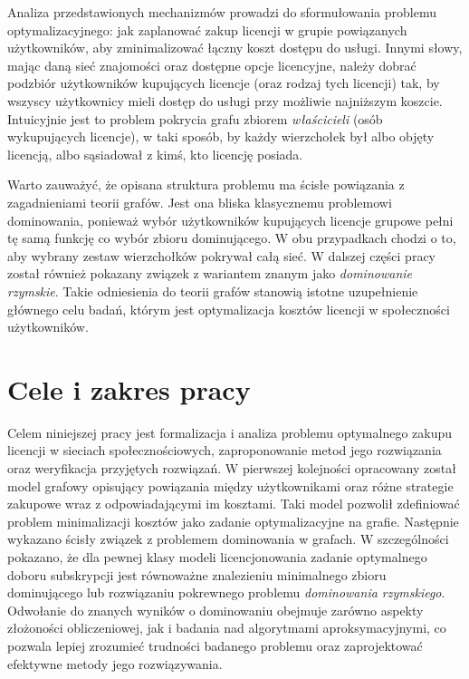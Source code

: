Analiza przedstawionych mechanizmów prowadzi do sformułowania problemu optymalizacyjnego: jak zaplanować zakup licencji w grupie powiązanych użytkowników, aby zminimalizować łączny koszt dostępu do usługi. Innymi słowy, mając daną sieć znajomości oraz dostępne opcje licencyjne, należy dobrać podzbiór użytkowników kupujących licencje (oraz rodzaj tych licencji) tak, by wszyscy użytkownicy mieli dostęp do usługi przy możliwie najniższym koszcie. Intuicyjnie jest to problem pokrycia grafu zbiorem \emph{właścicieli} (osób wykupujących licencje), w taki sposób, by każdy wierzchołek był albo objęty licencją, albo sąsiadował z kimś, kto licencję posiada.

Warto zauważyć, że opisana struktura problemu ma ścisłe powiązania z zagadnieniami teorii grafów. Jest ona bliska klasycznemu problemowi dominowania, ponieważ wybór użytkowników kupujących licencje grupowe pełni tę samą funkcję co wybór zbioru dominującego. W obu przypadkach chodzi o to, aby wybrany zestaw wierzchołków pokrywał całą sieć. W dalszej części pracy został również pokazany związek z wariantem znanym jako \emph{dominowanie rzymskie}. Takie odniesienia do teorii grafów stanowią istotne uzupełnienie głównego celu badań, którym jest optymalizacja kosztów licencji w społeczności użytkowników.



\section{Cele i zakres pracy}
Celem niniejszej pracy jest formalizacja i analiza problemu optymalnego zakupu licencji w sieciach społecznościowych, zaproponowanie metod jego rozwiązania oraz weryfikacja przyjętych rozwiązań. W pierwszej kolejności opracowany został model grafowy opisujący powiązania między użytkownikami oraz różne strategie zakupowe wraz z odpowiadającymi im kosztami. Taki model pozwolił zdefiniować problem minimalizacji kosztów jako zadanie optymalizacyjne na grafie. Następnie wykazano ścisły związek z problemem dominowania w grafach. W szczególności pokazano, że dla pewnej klasy modeli licencjonowania zadanie optymalnego doboru subskrypcji jest równoważne znalezieniu minimalnego zbioru dominującego lub rozwiązaniu pokrewnego problemu \emph{dominowania rzymskiego}. Odwołanie do znanych wyników o dominowaniu obejmuje zarówno aspekty złożoności obliczeniowej, jak i badania nad algorytmami aproksymacyjnymi, co pozwala lepiej zrozumieć trudności badanego problemu oraz zaprojektować efektywne metody jego rozwiązywania.

